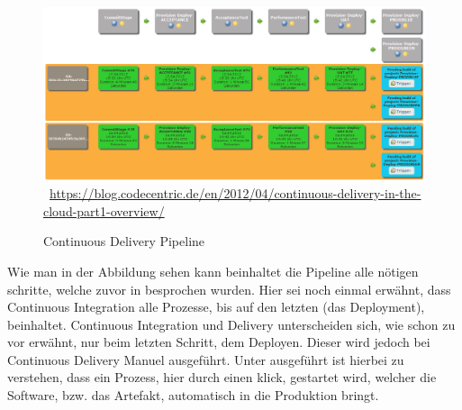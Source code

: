 \begin{figure}[htb]
    \centering 
    \includegraphics[width=\linewidth]{content/images/pipeline}\
    \quelle\url{https://blog.codecentric.de/en/2012/04/continuous-delivery-in-the-cloud-part1-overview/}
    \caption[Continuous Delivery Pipeline]{Continuous Delivery Pipeline\\}
    \label{fig:ContinuousDeliveryPipeline}  
\end{figure}\noindent 
Wie man in der Abbildung sehen kann beinhaltet die Pipeline alle nötigen schritte, welche zuvor in  besprochen wurden. Hier sei noch einmal erwähnt, dass Continuous Integration alle Prozesse, bis auf den letzten (das Deployment), beinhaltet. Continuous Integration und Delivery unterscheiden sich, wie schon zu vor erwähnt, nur beim letzten Schritt, dem Deployen. Dieser wird jedoch bei Continuous Delivery Manuel ausgeführt. Unter ausgeführt ist hierbei zu verstehen, dass ein Prozess, hier durch einen klick, gestartet wird, welcher die Software, bzw. das Artefakt, automatisch in die Produktion bringt.